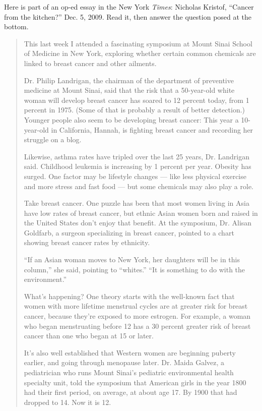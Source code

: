Here is part of an op-ed essay in the New York {\em Times}: Nicholas Kristof, ``Cancer from the kitchen?'' Dec. 5, 2009.  Read it, then answer the question posed at the bottom.

\begin{quotation}

This last week I attended a fascinating symposium at Mount Sinai School of Medicine in New York, exploring whether certain common chemicals are linked to breast cancer and other ailments.

Dr. Philip Landrigan, the chairman of the department of preventive medicine at Mount Sinai, said that the risk that a 50-year-old white woman will develop breast cancer has soared to 12 percent today, from 1 percent in 1975. (Some of that is probably a result of better detection.) Younger people also seem to be developing breast cancer: This year a 10-year-old in California, Hannah, is fighting breast cancer and recording her struggle on a blog.

Likewise, asthma rates have tripled over the last 25 years, Dr. Landrigan said. Childhood leukemia is increasing by 1 percent per year. Obesity has surged. One factor may be lifestyle changes --- like less physical exercise and more stress and fast food --- but some chemicals may also play a role.

Take breast cancer. One puzzle has been that most women living in Asia have low rates of breast cancer, but ethnic Asian women born and raised in the United States don't enjoy that benefit. At the symposium, Dr. Alisan Goldfarb, a surgeon specializing in breast cancer, pointed to a chart showing breast cancer rates by ethnicity.

``If an Asian woman moves to New York, her daughters will be in this column,'' she said, pointing to ``whites.'' ``It is something to do with the environment.''

What's happening? One theory starts with the well-known fact that women with more lifetime menstrual cycles are at greater risk for breast cancer, because they're exposed to more estrogen. For example, a woman who began menstruating before 12 has a 30 percent greater risk of breast cancer than one who began at 15 or later.

It's also well established that Western women are beginning puberty earlier, and going through menopause later. Dr. Maida Galvez, a pediatrician who runs Mount Sinai's pediatric environmental health specialty unit, told the symposium that American girls in the year 1800 had their first period, on average, at about age 17. By 1900 that had dropped to 14. Now it is 12.


\end{quotation}
